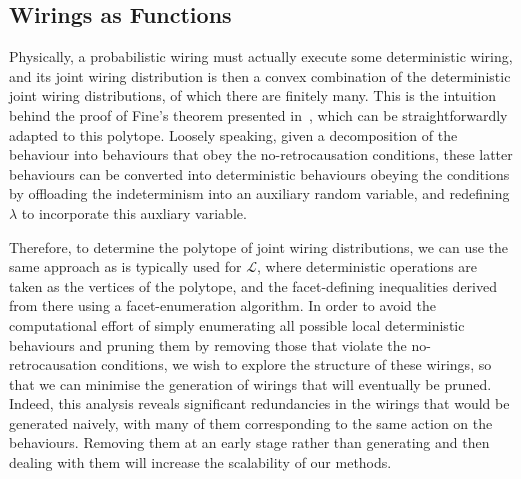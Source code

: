 \documentclass[10pt, a4paper]{article}
\numberwithin{equation}{section} %
\theoremstyle{definition}
\theoremstyle{plain}
\newcommand{\?}{\mathrel{?}} %
\newcommand{\Ls}{\mathcal{L}}
\begin{document}
      \subsection{Wirings as Functions}

      Physically, a probabilistic wiring must actually execute some deterministic wiring, and its joint wiring distribution is then a convex combination of the deterministic joint wiring distributions, of which there are finitely many. This is the intuition behind the proof of Fine's theorem presented in~\cite{BellNonlocality}, which can be straightforwardly adapted to this polytope. Loosely speaking, given a decomposition of the behaviour into behaviours that obey the no-retrocausation conditions, these latter behaviours can be converted into deterministic behaviours obeying the conditions by offloading the indeterminism into an auxiliary random variable, and redefining \(\lambda\) to incorporate this auxliary variable.

      Therefore, to determine the polytope of joint wiring distributions, we can use the same approach as is typically used for \(\Ls\), where deterministic operations are taken as the vertices of the polytope, and the facet-defining inequalities derived from there using a facet-enumeration algorithm. In order to avoid the computational effort of simply enumerating all possible local deterministic behaviours and pruning them by removing those that violate the no-retrocausation conditions, we wish to explore the structure of these wirings, so that we can minimise the generation of wirings that will eventually be pruned. Indeed, this analysis reveals significant redundancies in the wirings that would be generated naively, with many of them corresponding to the same action on the behaviours. Removing them at an early stage rather than generating and then dealing with them will increase the scalability of our methods.
\end{document}
